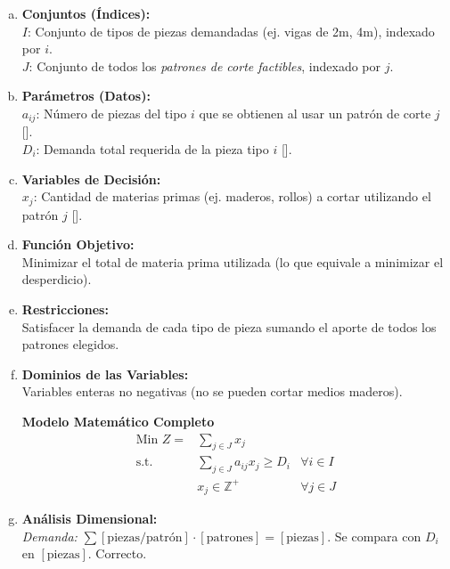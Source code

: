 \documentclass{article}
\begin{document}
	\begin{enumerate}[a)]
		\item \textbf{Conjuntos (Índices):}\\
		$I$: Conjunto de tipos de piezas demandadas (ej. vigas de 2m, 4m), indexado por $i$.\\
		$J$: Conjunto de todos los \textit{patrones de corte factibles}, indexado por $j$.
		
		\item \textbf{Parámetros (Datos):}\\
		$a_{ij}$: Número de piezas del tipo $i$ que se obtienen al usar un patrón de corte $j$ [].\\
		$D_i$: Demanda total requerida de la pieza tipo $i$ [].
		
		\item \textbf{Variables de Decisión:}\\
		$x_j$: Cantidad de materias primas (ej. maderos, rollos) a cortar utilizando el patrón $j$ [].
		
		\item \textbf{Función Objetivo:}\\
		Minimizar el total de materia prima utilizada (lo que equivale a minimizar el desperdicio).
		
		\item \textbf{Restricciones:}\\
		Satisfacer la demanda de cada tipo de pieza sumando el aporte de todos los patrones elegidos.
		
		\item \textbf{Dominios de las Variables:}\\
		Variables enteras no negativas (no se pueden cortar medios maderos).
		
		\vspace{0.5cm}
		\begin{center}
			\textbf{Modelo Matemático Completo}
			$$\begin{aligned}
				\text{Min } Z = & \sum_{j \in J} x_j \\
				\text{s.t.} \quad & \sum_{j \in J} a_{ij} x_j \geq D_i & \forall i \in I \\
				& x_j \in \mathbb{Z}^+ & \forall j \in J
			\end{aligned}$$
		\end{center}
		\vspace{0.5cm}
		
		\item \textbf{Análisis Dimensional:}\\
		\textit{Demanda:} $\sum [\text{piezas/patrón}] \cdot [\text{patrones}] = [\text{piezas}]$. Se compara con $D_i$ en $[\text{piezas}]$. Correcto.
	\end{enumerate}
	
\end{document}
